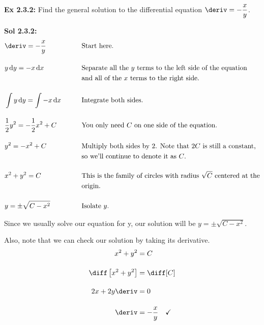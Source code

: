 \begin{tcolorbox}[example]
    \textbf{Ex 2.3.2: } Find the general solution to the differential equation $\deriv = -\dfrac{x}{y}$.
\end{tcolorbox}
\begin{tcolorbox}[solution]
    \textbf{Sol 2.3.2: } \vspace{11pt} \begin{alignat*}{2}
        & \deriv = -\frac{x}{y} &\qquad& \text{Start here.} \\[11pt]
        & y \,\mathrm{d}y = -x \,\mathrm{d}x &\qquad& \text{Separate all the $y$ terms to the left side of the equation} \\
        &  &\qquad& \text{and all of the $x$ terms to the right side.} \\[11pt]
        & \int y \,\mathrm{d}y = \int -x \,\mathrm{d}x &\qquad& \text{Integrate both sides.} \\[11pt]
        & \frac{1}{2}y^2 = -\frac{1}{2}x^2 + C &\qquad& \text{You only need $C$ on one side of the equation.} \\[11pt]
        & y^2 = -x^2 + C &\qquad& \text{Multiply both sides by 2. Note that $2C$ is still a constant,} \\
        &  &\qquad& \text{so we'll continue to denote it as $C$.} \\[11pt]
        & x^2 + y^2 = C &\qquad& \text{This is the family of circles with radius $\sqrt{C}$ centered at the} \\
        &  &\qquad& \text{origin.} \\[11pt]
        & y = \pm\sqrt{C - x^2} &\qquad& \text{Isolate $y$.}
    \end{alignat*}

    Since we usually solve our equation for y, our solution will be $\boxed{y = \pm\sqrt{C - x^2}}$. \par
    \vspace{11pt}
    Also, note that we can check our solution by taking its derivative. \begin{align*}
        x^2 + y^2 &= C \\[11pt]
        \diff \left[x^2 + y^2\right] &= \diff [C] \\[11pt]
        2x + 2y\deriv &= 0 \\[11pt]
        \deriv &= -\dfrac{x}{y} \quad \checkmark
    \end{align*}
\end{tcolorbox} \vspace{11pt}


